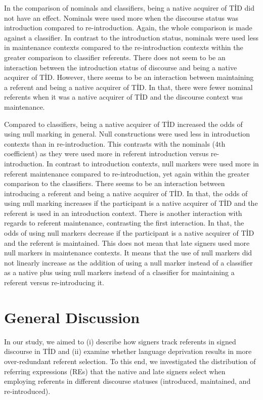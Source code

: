 \documentclass[]{elsarticle} %
\begin{document}
In the comparison of nominals and classifiers, being a native acquirer
of TİD did not have an effect. Nominals were used more when the
discourse status was introduction compared to re-introduction. Again,
the whole comparison is made against a classifier. In contrast to the
introduction status, nominals were used less in maintenance contexts
compared to the re-introduction contexts within the greater comparison
to classifier referents. There does not seem to be an interaction
between the introduction status of discourse and being a native acquirer
of TİD. However, there seems to be an interaction between maintaining a
referent and being a native acquirer of TİD. In that, there were fewer
nominal referents when it was a native acquirer of TİD and the discourse
context was maintenance.

Compared to classifiers, being a native acquirer of TİD increased the
odds of using null marking in general. Null constructions were used less
in introduction contexts than in re-introduction. This contrasts with
the nominals (4th coefficient) as they were used more in referent
introduction versus re-introduction. In contrast to introduction
contexts, null markers were used more in referent maintenance compared
to re-introduction, yet again within the greater comparison to the
classifiers. There seems to be an interaction between introducing a
referent and being a native acquirer of TİD. In that, the odds of using
null marking increases if the participant is a native acquirer of TİD
and the referent is used in an introduction context. There is another
interaction with regards to referent maintenance, contrasting the first
interaction. In that, the odds of using null markers decrease if the
participant is a native acquirer of TİD and the referent is maintained.
This does not mean that late signers used more null markers in
maintenance contexts. It means that the use of null markers did not
linearly increase as the addition of using a null marker instead of a
classifier as a native plus using null markers instead of a classifier
for maintaining a referent versus re-introducing it.

\hypertarget{general-discussion}{%
\section{General Discussion}\label{general-discussion}}

In our study, we aimed to (i) describe how signers track referents in
signed discourse in TİD and (ii) examine whether language deprivation
results in more over-redundant referent selection. To this end, we
investigated the distribution of referring expressions (REs) that the
native and late signers select when employing referents in different
discourse statuses (introduced, maintained, and re-introduced).
\end{document}
